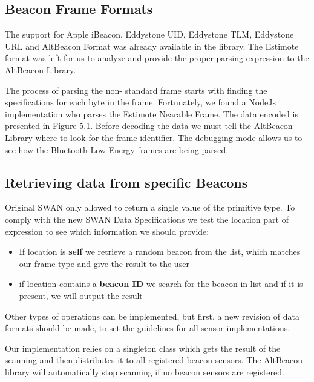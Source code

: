 \subsection{Beacon Frame Formats}
The support for Apple iBeacon, Eddystone UID, Eddystone TLM, Eddystone URL and AltBeacon Format was already available in the library.
The Estimote format was left for us to analyze and provide the proper parsing expression to the AltBeacon Library.

The process of parsing the non- standard frame starts with finding the specifications for each byte in the frame. Fortunately, we found a NodeJs implementation 
who parses the Estimote Nearable Frame. The data encoded is presented in \hyperref[fig:estimote_format]{Figure 5.1}.
Before decoding the data we must tell the AltBeacon Library where to look for the frame identifier. The debugging mode allows us to see how the Bluetooth Low Energy frames are being parsed.

\subsection{Retrieving data from specific Beacons}
Original SWAN only allowed to return a single value of the primitive type. To comply with the new SWAN Data Specifications we test the location part of expression to see which information we should provide:

\begin{itemize}
 \item If location is \textbf{self} we retrieve a random beacon from the list, which matches our frame type and give the result to the user
 \item if location contains a \textbf{beacon ID} we search for the beacon in list and if it is present, we will output the result
\end{itemize}

Other types of operations can be implemented, but first, a new revision of data formats should be made, to set the guidelines for all sensor implementations.

Our implementation relies on a singleton class which gets the result of the scanning and then distributes it to all registered beacon sensors. The AltBeacon library will automatically stop scanning
if no beacon sensors are registered.

